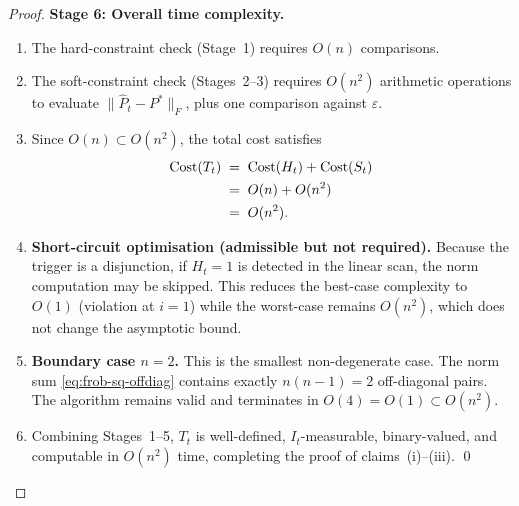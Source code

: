 \documentclass[12pt,openany]{book}
\numberwithin{equation}{chapter}
\theoremstyle{plain}
\theoremstyle{definition}
\theoremstyle{remark}
\def\mathcal#1{#1}%
\begin{document}
\begin{proof}
\medskip
\noindent\textbf{Stage 6: Overall time complexity.}
\begin{enumerate}
  \item The hard-constraint check (Stage~1) requires
        $O(n)$ comparisons.

  \item The soft-constraint check (Stages~2--3) requires
        $O(n^2)$ arithmetic operations to evaluate
        $\|\hat{P}_t - P^*\|_F$, plus one comparison against
        $\varepsilon$.

  \item Since $O(n) \subset O(n^2)$, the total cost satisfies
        \begin{align}
          \mathrm{Cost}(T_t)
          &\;=\; \mathrm{Cost}(H_t) + \mathrm{Cost}(S_t) \notag\\
          &\;=\; O(n) + O(n^2) \notag\\
          &\;=\; O(n^2).
          \label{eq:total-complexity}
        \end{align}

  \item \textbf{Short-circuit optimisation (admissible but not
        required).}
        Because the trigger is a disjunction, if $H_t = 1$ is
        detected in the linear scan, the norm computation may be
        skipped.  This reduces the best-case complexity to $O(1)$
        (violation at $i=1$) while the worst-case remains $O(n^2)$,
        which does not change the asymptotic bound.

  \item \textbf{Boundary case $n = 2$.}
        This is the smallest non-degenerate case.  The norm sum
        \eqref{eq:frob-sq-offdiag} contains exactly
        $n(n-1) = 2$ off-diagonal pairs.  The algorithm remains
        valid and terminates in $O(4) = O(1) \subset O(n^2)$.

  \item Combining Stages~1--5, $T_t$ is well-defined,
        $\mathcal{I}_t$-measurable, binary-valued, and computable in
        $O(n^2)$ time, completing the proof of
        claims~(i)--(iii). \qed
\end{enumerate}
\end{proof}
\end{document}
